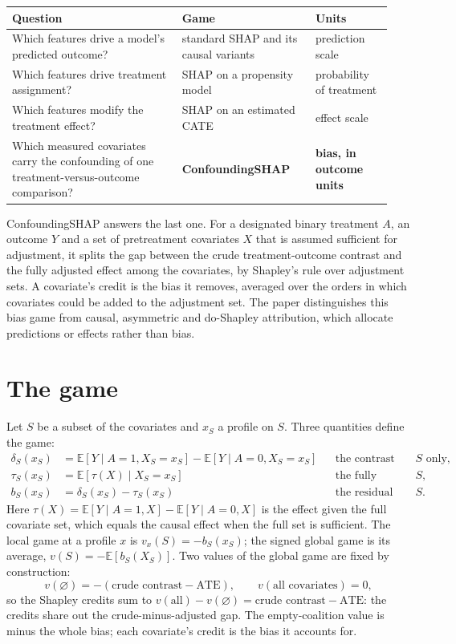 \documentclass[10pt,letterpaper]{article}
\newcommand{\E}{\mathbb{E}}
\begin{document}
\begin{center}
\begin{tabular}{@{}L{0.42\linewidth}L{0.33\linewidth}L{0.19\linewidth}@{}}
\toprule Question & Game & Units\\\midrule
Which features drive a model's predicted outcome? & standard SHAP and its causal variants & prediction scale\\
Which features drive treatment assignment? & SHAP on a propensity model & probability of treatment\\
Which features modify the treatment effect? & SHAP on an estimated CATE & effect scale\\
Which measured covariates carry the confounding of one treatment-versus-outcome comparison? & \textbf{ConfoundingSHAP} & \textbf{bias, in outcome units}\\
\bottomrule
\end{tabular}
\end{center}

ConfoundingSHAP answers the last one. For a designated binary treatment $A$, an outcome $Y$ and a set of pretreatment covariates $X$ that is assumed sufficient for adjustment, it splits the gap between the crude treatment-outcome contrast and the fully adjusted effect among the covariates, by Shapley's rule over adjustment sets. A covariate's credit is the bias it removes, averaged over the orders in which covariates could be added to the adjustment set. The paper distinguishes this bias game from causal, asymmetric and do-Shapley attribution, which allocate predictions or effects rather than bias.

\section{The game}
Let $S$ be a subset of the covariates and $x_S$ a profile on $S$. Three quantities define the game:
\begin{align*}
\delta_S(x_S) &= \E[Y \mid A=1, X_S=x_S] - \E[Y \mid A=0, X_S=x_S] && \text{the contrast adjusted for $S$ only,}\\
\tau_S(x_S) &= \E[\tau(X) \mid X_S = x_S] && \text{the fully adjusted effect, projected onto $S$,}\\
b_S(x_S) &= \delta_S(x_S) - \tau_S(x_S) && \text{the residual confounding bias after adjusting for $S$.}
\end{align*}
Here $\tau(X)=\E[Y\mid A=1,X]-\E[Y\mid A=0,X]$ is the effect given the full covariate set, which equals the causal effect when the full set is sufficient. The local game at a profile $x$ is $v_x(S) = -b_S(x_S)$; the signed global game is its average, $v(S) = -\E[b_S(X_S)]$. Two values of the global game are fixed by construction:
\[
v(\varnothing) = -(\text{crude contrast} - \text{ATE}), \qquad v(\text{all covariates}) = 0,
\]
so the Shapley credits sum to $v(\text{all}) - v(\varnothing) = \text{crude contrast} - \text{ATE}$: the credits share out the crude-minus-adjusted gap. The empty-coalition value is minus the whole bias; each covariate's credit is the bias it accounts for.
\end{document}

